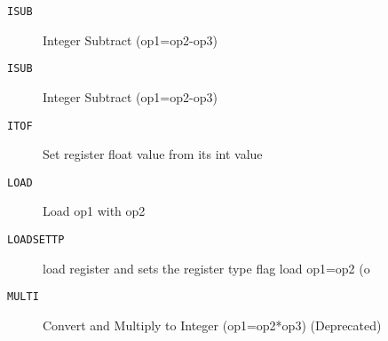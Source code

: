 \begin{description}
\item[\texttt{ISUB}]  Integer Subtract (op1=op2-op3)\\

\end{description}
\begin{description}
\item[\texttt{ISUB}]  Integer Subtract (op1=op2-op3)\\

\end{description}
\begin{description}
\item[\texttt{ITOF}]  Set register float value from its int value\\

\end{description}
\begin{description}
\item[\texttt{LOAD}]  Load op1 with op2\\

\end{description}
\begin{description}
\item[\texttt{LOADSETTP}]  load register and sets the register type flag load op1=op2 (o\\

\end{description}
\begin{description}
\item[\texttt{MULTI}]  Convert and Multiply to Integer (op1=op2*op3) (Deprecated)\\

\end{description}
